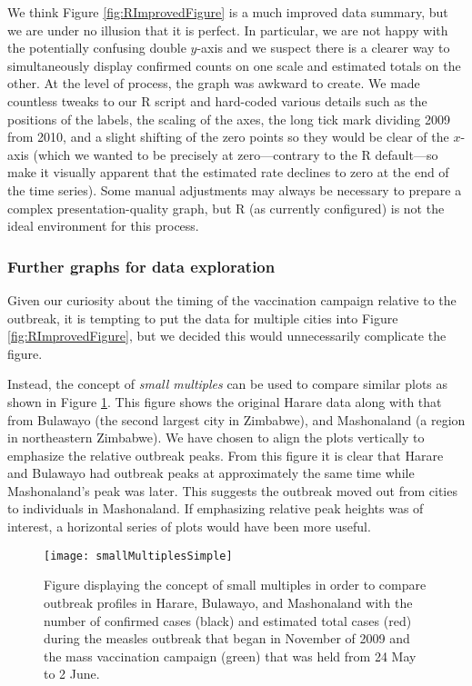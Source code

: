 \documentclass[12pt]{article}
\begin{document}
We think Figure \ref{fig:RImprovedFigure} is a much improved data summary, but we are under no illusion that it is perfect.  In particular, we are not happy with the potentially confusing double $y$-axis and we suspect there is a clearer way to simultaneously display confirmed counts on one scale and estimated totals on the other.  At the level of process, the graph was awkward to create.  We made countless tweaks to our R script and hard-coded various details such as the positions of the labels, the scaling of the axes, the long tick mark dividing 2009 from 2010, and a slight shifting of the zero points so they would be clear of the $x$-axis (which we wanted to be precisely at zero---contrary to the R default---so make it visually apparent that the estimated rate declines to zero at the end of the time series).  Some manual adjustments may always be necessary to prepare a complex presentation-quality graph, but R (as currently configured) is not the ideal environment for this process.

\subsubsection*{Further graphs for data exploration}

Given our curiosity about the timing of the vaccination campaign relative to the outbreak, it is tempting to put the data for multiple cities into Figure  \ref{fig:RImprovedFigure}, but we decided this would unnecessarily complicate the figure.

Instead, the concept of \emph{small multiples} can be used to compare similar plots as shown in Figure \ref{fig:smallMultiples}. This figure shows the original Harare data along with that from Bulawayo (the second largest city in Zimbabwe), and Mashonaland (a region in northeastern Zimbabwe). We have chosen to align the plots vertically to emphasize the relative outbreak peaks. From this figure it is clear that Harare and Bulawayo had outbreak peaks at approximately the same time while Mashonaland's peak was later. This suggests the outbreak moved out from cities to individuals in Mashonaland. If emphasizing relative peak heights was of interest, a horizontal series of plots would have been more useful.
\begin{figure}[ht]
\centering
\texttt{[image: smallMultiplesSimple]}
\caption{Figure displaying the concept of small multiples in order to compare outbreak profiles in Harare, Bulawayo, and Mashonaland with the number of confirmed cases (black) and estimated total cases (red)  during the measles outbreak that began in November of 2009 and the mass vaccination campaign (green) that was held from 24 May to 2 June.}
\label{fig:smallMultiples}
\end{figure}
\end{document}
